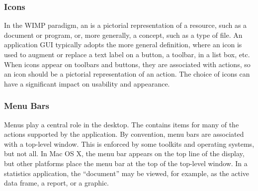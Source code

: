 
\subsubsection{Icons}
\label{sec:GUI:icons}

In the WIMP paradigm, an  is a pictorial representation of a
resource, such as a document or program, or, more generally, a
concept, such as a type of file. An application GUI typically adopts
the more general definition, where an icon is used to augment or
replace a text label on a button, a toolbar, in a list box, etc. When
icons appear on toolbars and buttons, they are associated with
actions, so an icon should be a pictorial representation of an
action. The choice of icons can have a significant impact on usability
and appearance.



\subsubsection{Menu Bars}
\label{sec:GUI:menubars}

Menus play a central role in the  desktop. The  contains items for many of the actions supported by the
application.  By convention, menu bars are associated with a top-level
window. This is enforced by some toolkits and operating systems, but
not all. In Mac OS X, the menu bar appears on the top line of the
display, but other platforms place the menu bar at the top of the
top-level window. In a statistics application, the ``document'' may be
viewed, for example, as the active data frame, a report, or a graphic.

